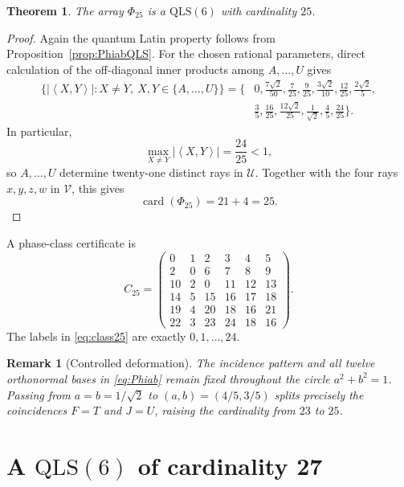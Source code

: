 \documentclass[11pt,a4paper]{article}
\newcommand{\QLS}{\mathrm{QLS}}
\newcommand{\card}{\operatorname{card}}
\newcommand{\ip}[2]{\left\langle #1,#2\right\rangle}
\newtheorem{theorem}{Theorem}
\newtheorem{remark}{Remark}
\begin{document}
\begin{theorem}\label{thm:c25}
The array $\Phi_{25}$ is a $\QLS(6)$ with cardinality $25$.
\end{theorem}

\begin{proof}
Again the quantum Latin property follows from
Proposition~\ref{prop:PhiabQLS}.  For the chosen rational parameters, direct
calculation of the off-diagonal inner products among $A,\ldots,U$ gives
\begin{align*}
 \bigl\{|\ip{X}{Y}|:X\ne Y,\ X,Y\in\{A,\ldots,U\}\bigr\}
 =\biggl\{&0,\frac{7\sqrt2}{50},\frac7{25},\frac9{25},
 \frac{3\sqrt2}{10},\frac{12}{25},\frac{2\sqrt2}{5},\\
 &\frac35,\frac{16}{25},\frac{12\sqrt2}{25},
 \frac1{\sqrt2},\frac45,\frac{24}{25}\biggr\}.
\end{align*}
In particular,
\[
 \max_{X\ne Y}|\ip{X}{Y}|=\frac{24}{25}<1,
\]
so $A,\ldots,U$ determine twenty-one distinct rays in $\mathcal U$.  Together
with the four rays $x,y,z,w$ in $\mathcal V$, this gives
\[
 \card(\Phi_{25})=21+4=25.
\]
\end{proof}

A phase-class certificate is
\begin{equation}\label{eq:class25}
C_{25}=
\begin{pmatrix}
0&1&2&3&4&5\\
2&0&6&7&8&9\\
10&2&0&11&12&13\\
14&5&15&16&17&18\\
19&4&20&18&16&21\\
22&3&23&24&18&16
\end{pmatrix}.
\end{equation}
The labels in \eqref{eq:class25} are exactly $0,1,\ldots,24$.

\begin{remark}[Controlled deformation]
The incidence pattern and all twelve orthonormal bases in \eqref{eq:Phiab}
remain fixed throughout the circle $a^2+b^2=1$.  Passing from
$a=b=1/\sqrt2$ to $(a,b)=(4/5,3/5)$ splits precisely the coincidences
$F=T$ and $J=U$, raising the cardinality from $23$ to $25$.
\end{remark}

\section{A \texorpdfstring{$\QLS(6)$}{QLS(6)} of cardinality 27}\label{sec:c27}
\end{document}
